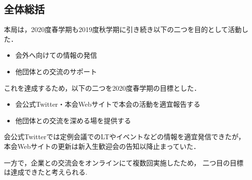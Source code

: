 \subsection*{全体総括}


本局は，2020度春学期も2019度秋学期に引き続き以下の二つを目的として活動した．
\begin{itemize}
    \item 会外へ向けての情報の発信
    \item 他団体との交流のサポート
\end{itemize}
これを達成するため，以下の二つを2020度春学期の目標とした．
\begin{itemize}
    \item 会公式Twitter・本会Webサイトで本会の活動を適宜報告する
    \item 他団体との交流を深める場を提供する
\end{itemize}

会公式Twitterでは定例会議でのLTやイベントなどの情報を適宜発信できたが，
本会Webサイトの更新は新入生歓迎会の告知以降止まっていた．

一方で，企業との交流会をオンラインにて複数回実施したため，
二つ目の目標は達成できたと考えられる.
